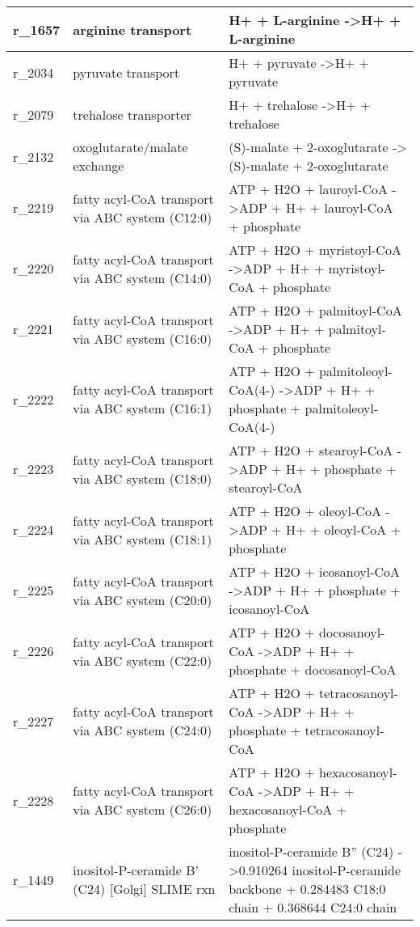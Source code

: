 \begin{landscape}
{\begin{longtable}{|l|p{7cm}|p{15cm}|}
r\_1657 & arginine transport & H+ + L-arginine  -\textgreater H+ + L-arginine \\ \hline
r\_2034 & pyruvate transport & H+ + pyruvate  -\textgreater H+ + pyruvate \\ \hline
r\_2079 & trehalose transporter & H+ + trehalose  -\textgreater H+ + trehalose \\ \hline
r\_2132 & oxoglutarate/malate exchange & (S)-malate + 2-oxoglutarate  -\textgreater (S)-malate + 2-oxoglutarate \\ \hline
r\_2219 & fatty acyl-CoA transport via ABC system (C12:0) & ATP + H2O + lauroyl-CoA  -\textgreater ADP + H+ + lauroyl-CoA + phosphate \\ \hline
r\_2220 & fatty acyl-CoA transport via ABC system (C14:0) & ATP + H2O + myristoyl-CoA  -\textgreater ADP + H+ + myristoyl-CoA + phosphate \\ \hline
r\_2221 & fatty acyl-CoA transport via ABC system (C16:0) & ATP + H2O + palmitoyl-CoA  -\textgreater ADP + H+ + palmitoyl-CoA + phosphate \\ \hline
r\_2222 & fatty acyl-CoA transport via ABC system (C16:1) & ATP + H2O + palmitoleoyl-CoA(4-)  -\textgreater ADP + H+ + phosphate + palmitoleoyl-CoA(4-) \\ \hline
r\_2223 & fatty acyl-CoA transport via ABC system (C18:0) & ATP + H2O + stearoyl-CoA  -\textgreater ADP + H+ + phosphate + stearoyl-CoA \\ \hline
r\_2224 & fatty acyl-CoA transport via ABC system (C18:1) & ATP + H2O + oleoyl-CoA  -\textgreater ADP + H+ + oleoyl-CoA + phosphate \\ \hline
r\_2225 & fatty acyl-CoA transport via ABC system (C20:0) & ATP + H2O + icosanoyl-CoA  -\textgreater ADP + H+ + phosphate + icosanoyl-CoA \\ \hline
r\_2226 & fatty acyl-CoA transport via ABC system (C22:0) & ATP + H2O + docosanoyl-CoA  -\textgreater ADP + H+ + phosphate + docosanoyl-CoA \\ \hline
r\_2227 & fatty acyl-CoA transport via ABC system (C24:0) & ATP + H2O + tetracosanoyl-CoA  -\textgreater ADP + H+ + phosphate + tetracosanoyl-CoA \\ \hline
r\_2228 & fatty acyl-CoA transport via ABC system (C26:0) & ATP + H2O + hexacosanoyl-CoA  -\textgreater ADP + H+ + hexacosanoyl-CoA + phosphate \\ \hline
r\_1449 & inositol-P-ceramide B' (C24) {[}Golgi{]} SLIME rxn & inositol-P-ceramide B'' (C24)  -\textgreater 0.910264 inositol-P-ceramide backbone + 0.284483 C18:0 chain + 0.368644 C24:0 chain \\ \hline

\end{longtable}}
\end{landscape}
